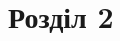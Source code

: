 \documentclass[handout, 8pt]{beamer}
\numberwithin{figure}{section}
\numberwithin{equation}{section}
\numberwithin{table}{section}
\begin{document}
%
%
%
%



\section{Розділ 2}
\end{document}
